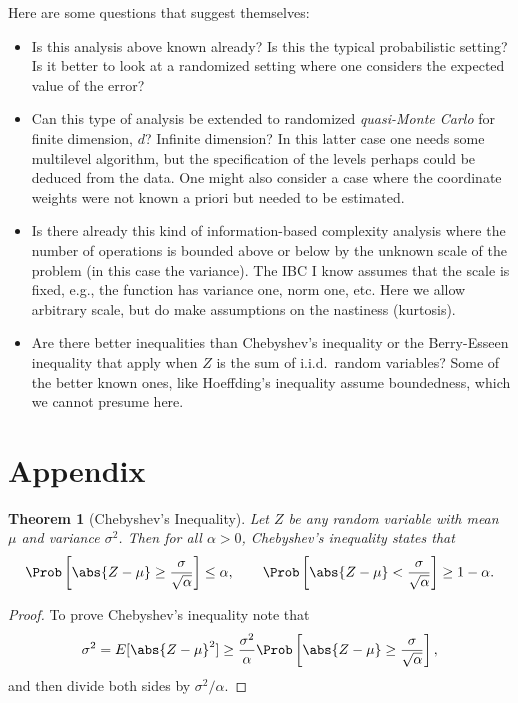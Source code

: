 \documentclass[12pt]{amsart}
\newtheorem{theorem}{Theorem}
\begin{document}
Here are some questions that suggest themselves:

\begin{itemize}

\item Is this analysis above known already?  Is this the typical probabilistic setting?  Is it better to look at a randomized setting where one considers the expected value of the error?

\item Can this type of analysis be extended to randomized \emph{quasi-Monte Carlo} for finite dimension, $d$?  Infinite dimension?  In this latter case one needs some multilevel algorithm, but the specification of the levels perhaps could be deduced from the data.  One might also consider a case where the coordinate weights were not known a priori but needed to be estimated.

\item Is there already this kind of information-based complexity analysis where the number of operations is bounded above or below by the unknown scale of the problem (in this case the variance).  The IBC I know assumes that the scale is fixed, e.g., the function has variance one, norm one, etc.  Here we allow arbitrary scale, but do make assumptions on the nastiness (kurtosis).

\item Are there better inequalities than Chebyshev's inequality or the Berry-Esseen inequality that apply when $Z$ is the sum of i.i.d.\ random variables?  Some of the better known ones, like Hoeffding's inequality assume boundedness, which we cannot presume here.

\end{itemize}

\section*{Appendix}
\begin{theorem}[Chebyshev's Inequality] \label{Chebineqthm} Let $Z$ be any random variable with mean $\mu$ and variance $\sigma^2$.  Then for all $\alpha >0$, Chebyshev's inequality states that
\[
\Prob\left[\abs{Z-\mu} \ge \frac{\sigma}{\sqrt{\alpha}} \right] \le \alpha, \qquad \Prob\left[\abs{Z-\mu} < \frac{\sigma}{\sqrt{\alpha}} \right] \ge 1-\alpha.
\]
\end{theorem}
\begin{proof}To prove Chebyshev's inequality note that
\begin{equation*}
\sigma^2 = E[\abs{Z-\mu}^2] \ge \frac{\sigma^2}{\alpha} \Prob\left[\abs{Z-\mu} \ge \frac{\sigma}{\sqrt{\alpha}} \right],
\end{equation*}
and then divide both sides by $\sigma^2/\alpha$.
\end{proof}
\end{document}

